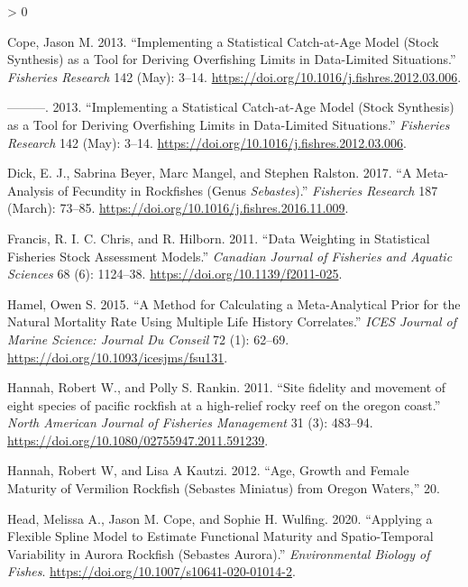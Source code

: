 \documentclass[11pt,
  english,
  a4paper,
]{article}
\newlength{\cslhangindent}
\newenvironment{CSLReferences}[2] %
 {%
  \setlength{\parindent}{0pt}
  \ifodd #1 \everypar{\setlength{\hangindent}{\cslhangindent}}\ignorespaces\fi
  \ifnum #2 > 0
  \setlength{\parskip}{#2\baselineskip}
  \fi
 }%
 {}
\begin{document}
\leavevmode\tagmcend\tagstructend


\hypertarget{refs}{}
\begin{CSLReferences}{1}{0}
\leavevmode\hypertarget{ref-cope_implementing_2013}{}%
Cope, Jason M. 2013. {``Implementing a Statistical Catch-at-Age Model (Stock Synthesis) as a Tool for Deriving Overfishing Limits in Data-Limited Situations.''} \emph{Fisheries Research} 142 (May): 3--14. \url{https://doi.org/10.1016/j.fishres.2012.03.006}.

\leavevmode\hypertarget{ref-cope_implementing_2013}{}%
---------. 2013. {``Implementing a Statistical Catch-at-Age Model (Stock Synthesis) as a Tool for Deriving Overfishing Limits in Data-Limited Situations.''} \emph{Fisheries Research} 142 (May): 3--14. \url{https://doi.org/10.1016/j.fishres.2012.03.006}.

\leavevmode\hypertarget{ref-dick_meta-analysis_2017}{}%
Dick, E. J., Sabrina Beyer, Marc Mangel, and Stephen Ralston. 2017. {``A Meta-Analysis of Fecundity in Rockfishes (Genus \emph{Sebastes}).''} \emph{Fisheries Research} 187 (March): 73--85. \url{https://doi.org/10.1016/j.fishres.2016.11.009}.

\leavevmode\hypertarget{ref-francis_data_2011}{}%
Francis, R. I. C. Chris, and R. Hilborn. 2011. {``Data Weighting in Statistical Fisheries Stock Assessment Models.''} \emph{Canadian Journal of Fisheries and Aquatic Sciences} 68 (6): 1124--38. \url{https://doi.org/10.1139/f2011-025}.

\leavevmode\hypertarget{ref-hamel_method_2015}{}%
Hamel, Owen S. 2015. {``A Method for Calculating a Meta-Analytical Prior for the Natural Mortality Rate Using Multiple Life History Correlates.''} \emph{ICES Journal of Marine Science: Journal Du Conseil} 72 (1): 62--69. \url{https://doi.org/10.1093/icesjms/fsu131}.

\leavevmode\hypertarget{ref-Hannah2011}{}%
Hannah, Robert W., and Polly S. Rankin. 2011. {``{Site fidelity and movement of eight species of pacific rockfish at a high-relief rocky reef on the oregon coast}.''} \emph{North American Journal of Fisheries Management} 31 (3): 483--94. \url{https://doi.org/10.1080/02755947.2011.591239}.

\leavevmode\hypertarget{ref-hannah_age_2012}{}%
Hannah, Robert W, and Lisa A Kautzi. 2012. {``Age, Growth and Female Maturity of Vermilion Rockfish (Sebastes Miniatus) from Oregon Waters,''} 20.

\leavevmode\hypertarget{ref-head_fxnalmatspline_2020}{}%
Head, Melissa A., Jason M. Cope, and Sophie H. Wulfing. 2020. {``Applying a Flexible Spline Model to Estimate Functional Maturity and Spatio-Temporal Variability in Aurora Rockfish (Sebastes Aurora).''} \emph{Environmental Biology of Fishes}. \url{https://doi.org/10.1007/s10641-020-01014-2}.


\end{CSLReferences}
\end{document}
